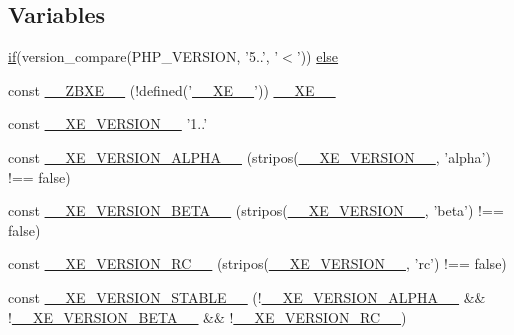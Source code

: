 \subsection*{Variables}
\begin{DoxyCompactItemize}
\item 
\hyperlink{config_8inc_8php_a95d67dac5da3e46d0b07e9ad1647d08a}{if}(version\-\_\-compare(P\-H\-P\-\_\-\-V\-E\-R\-S\-I\-O\-N, '5..', '$<$')) \hyperlink{config_8inc_8php_a249caa62ba3f93fa3cb8d963d5634fe1}{else}
\item 
const \hyperlink{config_8inc_8php_a5dee6469b95523a5bafe17e6b29c6bf7}{\-\_\-\-\_\-\-Z\-B\-X\-E\-\_\-\-\_\-} (!defined('\hyperlink{index_8php_a697de427d83b791899ae45d555377756}{\-\_\-\-\_\-\-X\-E\-\_\-\-\_\-}')) \hyperlink{index_8php_a697de427d83b791899ae45d555377756}{\-\_\-\-\_\-\-X\-E\-\_\-\-\_\-}
\item 
const \hyperlink{config_8inc_8php_afceaaec30d0e5b6a78d0ae28bcbfc8f3}{\-\_\-\-\_\-\-X\-E\-\_\-\-V\-E\-R\-S\-I\-O\-N\-\_\-\-\_\-} '1..'
\item 
const \hyperlink{config_8inc_8php_aaee982ed748e379cde978edfe8d433e1}{\-\_\-\-\_\-\-X\-E\-\_\-\-V\-E\-R\-S\-I\-O\-N\-\_\-\-A\-L\-P\-H\-A\-\_\-\-\_\-} (stripos(\hyperlink{config_8inc_8php_afceaaec30d0e5b6a78d0ae28bcbfc8f3}{\-\_\-\-\_\-\-X\-E\-\_\-\-V\-E\-R\-S\-I\-O\-N\-\_\-\-\_\-}, 'alpha') !== false)
\item 
const \hyperlink{config_8inc_8php_aac8a83557f3eab1d2d2583fe21559ca9}{\-\_\-\-\_\-\-X\-E\-\_\-\-V\-E\-R\-S\-I\-O\-N\-\_\-\-B\-E\-T\-A\-\_\-\-\_\-} (stripos(\hyperlink{config_8inc_8php_afceaaec30d0e5b6a78d0ae28bcbfc8f3}{\-\_\-\-\_\-\-X\-E\-\_\-\-V\-E\-R\-S\-I\-O\-N\-\_\-\-\_\-}, 'beta') !== false)
\item 
const \hyperlink{config_8inc_8php_a1d41a8e68af4b70491bdb523ccb57ac2}{\-\_\-\-\_\-\-X\-E\-\_\-\-V\-E\-R\-S\-I\-O\-N\-\_\-\-R\-C\-\_\-\-\_\-} (stripos(\hyperlink{config_8inc_8php_afceaaec30d0e5b6a78d0ae28bcbfc8f3}{\-\_\-\-\_\-\-X\-E\-\_\-\-V\-E\-R\-S\-I\-O\-N\-\_\-\-\_\-}, 'rc') !== false)
\item 
const \hyperlink{config_8inc_8php_ae578aaae34567264807d3f832230c1ed}{\-\_\-\-\_\-\-X\-E\-\_\-\-V\-E\-R\-S\-I\-O\-N\-\_\-\-S\-T\-A\-B\-L\-E\-\_\-\-\_\-} (!\hyperlink{config_8inc_8php_aaee982ed748e379cde978edfe8d433e1}{\-\_\-\-\_\-\-X\-E\-\_\-\-V\-E\-R\-S\-I\-O\-N\-\_\-\-A\-L\-P\-H\-A\-\_\-\-\_\-} \&\& !\hyperlink{config_8inc_8php_aac8a83557f3eab1d2d2583fe21559ca9}{\-\_\-\-\_\-\-X\-E\-\_\-\-V\-E\-R\-S\-I\-O\-N\-\_\-\-B\-E\-T\-A\-\_\-\-\_\-} \&\& !\hyperlink{config_8inc_8php_a1d41a8e68af4b70491bdb523ccb57ac2}{\-\_\-\-\_\-\-X\-E\-\_\-\-V\-E\-R\-S\-I\-O\-N\-\_\-\-R\-C\-\_\-\-\_\-})

\end{DoxyCompactItemize}
